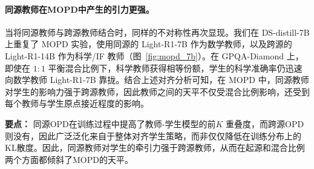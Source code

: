 \paragraph{同源教师在MOPD中产生的引力更强。}
当将同源教师与跨源教师结合时，同样的不对称性再次显现。我们在 DS-distill-7B 上重复了 MOPD 实验，使用同源的 Light-R1-7B 作为数学教师，以及跨源的 Light-R1-14B 作为科学/IF 教师（图~\ref{fig:mopd_7b}）。在 GPQA-Diamond 上，即使在 $1{:}1$ 平衡混合比例下，科学教师获得相等份额，学生的科学准确率仍迅速向数学教师 Light-R1-7B 靠拢。结合上述对齐分析可知，在 MOPD 中，同源教师对学生的影响力强于跨源教师，因此教师之间的天平不仅受混合比例影响，还受到每个教师与学生原点接近程度的影响。

\begin{insightbox}
\textbf{要点：}
同源OPD在训练过程中提高了教师-学生模型的前$K$ 重叠度，而跨源OPD则没有，因此广泛泛化来自于整体对齐学生策略，而非仅仅降低在训练分布上的KL散度。因此，同源教师对学生的牵引力强于跨源教师，从而在起源和混合比例两个方面都倾斜了MOPD的天平。
\end{insightbox}